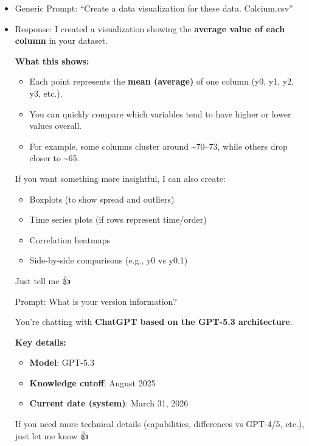 \documentclass[
  letterpaper,
  DIV=11,
  numbers=noendperiod]{scrartcl}
\begin{document}
\begin{itemize}
\item
  Generic Prompt: ``Create a data visualization for these data.
  Calcium.csv''
\item
  Response: I created a visualization showing the \textbf{average value
  of each column} in your dataset.

  \textbf{What this shows:}

  \begin{itemize}
  \item
    Each point represents the \textbf{mean (average)} of one column (y0,
    y1, y2, y3, etc.).
  \item
    You can quickly compare which variables tend to have higher or lower
    values overall.
  \item
    For example, some columns cluster around \textasciitilde70--73,
    while others drop closer to \textasciitilde65.
  \end{itemize}

  If you want something more insightful, I can also create:

  \begin{itemize}
  \item
    Boxplots (to show spread and outliers)
  \item
    Time series plots (if rows represent time/order)
  \item
    Correlation heatmaps
  \item
    Side-by-side comparisons (e.g., y0 vs y0.1)
  \end{itemize}

  Just tell me 👍

  Prompt: What is your version information?

  You're chatting with \textbf{ChatGPT based on the GPT-5.3
  architecture}.

  \textbf{Key details:}

  \begin{itemize}
  \item
    \textbf{Model}: GPT-5.3
  \item
    \textbf{Knowledge cutoff}: August 2025
  \item
    \textbf{Current date (system)}: March 31, 2026
  \end{itemize}

  If you need more technical details (capabilities, differences vs
  GPT-4/5, etc.), just let me know 👍
\end{itemize}
\end{document}
